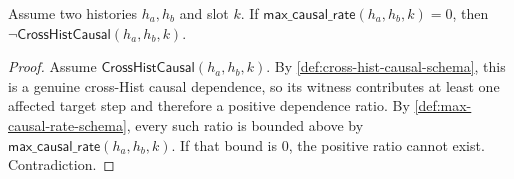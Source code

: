 \begin{lemma}
\label{lem:zero-max-rate-forbids-causal-dependence}
Assume two histories $h_a, h_b$ and slot $k$. If
$\mathsf{max\_causal\_rate}(h_a,h_b,k)=0$, then $\neg\textsf{CrossHistCausal}(h_a,h_b,k)$.
\begin{proof}
Assume $\textsf{CrossHistCausal}(h_a,h_b,k)$. By 
\autoref{def:cross-hist-causal-schema}, this is a genuine cross-Hist causal dependence, so its witness contributes at least one affected target step and therefore a positive dependence ratio.
By 
\autoref{def:max-causal-rate-schema}, every such ratio is bounded above by
$\mathsf{max\_causal\_rate}(h_a,h_b,k)$. If that bound is $0$, the positive ratio cannot exist. Contradiction.
\end{proof}
\end{lemma}
